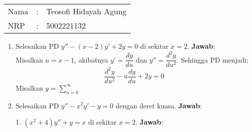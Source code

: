 \documentclass[10pt,openany,a4paper]{article}
\newcommand{\jawab}{\textbf{Jawab}:}
\begin{document}
    \begin{tabular}{|lcl|}
     \hline
     Nama&:&Teosofi Hidayah Agung\\
     NRP&:&5002221132\\
     \hline
    \end{tabular}
    \begin{enumerate}
        \item Selesaikan PD $y''-(x-2)y'+2y=0$ di sekitar $x=2$.
        \jawab\\
        Misalkan $u=x-1$, akibatnya $y'=\dfrac{dy}{du}$ dan $y''=\dfrac{d^2y}{du^2}$. Sehingga 
        PD menjadi:
        \[\frac{d^2y}{du^2}-u\frac{dy}{du}+2y=0\]
        Misalkan $y=\sum_{n=0}^{\infty}$

        \item Selesaikan PD $y''-x^2y'-y=0$ dengan deret kuasa.
        \jawab\\

        \item[1.] $(x^2+4)y''+y=x$ di sekitar $x=2$.
        \jawab\\
    \end{enumerate}
\end{document}
